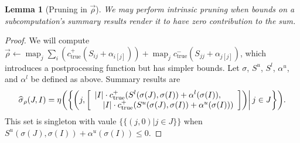 \documentclass{article}
\newtheorem{lemma}{Lemma}
\newcommand{\killspace}{\vspace{-0.08in}}
\newcommand{\sigmahat}{\mathbin{\widehat{\sigma}}}
\DeclareMathOperator*{\map}{map}
\newcommand{\simhrectmin}{S^{l}}
\newcommand{\simhrectmax}{S^{u}}
\newcommand{\true}{\text{true}}
\newcommand{\ocpos}[1]{c^{+}_{#1}}
\newcommand{\ocneg}[1]{c^{-}_{#1}}
\newcommand{\simil}[2]{S_{#1#2}}
\newcommand{\vecrho}{\vec{\rho}}
\newcommand{\falphaj}[2]{\alpha_{#1[#2]}}
\newcommand{\falphamax}{\alpha^{u}}
\newcommand{\falphamin}{\alpha^{l}}
\begin{document}
\begin{lemma}[Pruning in $\vecrho$]
  We may perform intrinsic pruning when bounds on a subcomputation's summary results render it to have zero contribution to the sum.
\end{lemma}
\killspace
\begin{proof}
  We will compute $\vecrho \gets \map_j \sum_i (
  \ocpos{\true}(\simil{i}{j} + \falphaj{i}{j}) ) + \map_j
  \ocneg{\true}(\simil{j}{j} + \falphaj{j}{j})$, which introduces a
  postprocessing function but has simpler bounds.  Let $\sigma$,
  $\simhrectmax$, $\simhrectmin$, $\falphamax$, and $\falphamin$ be
  defined as above.  Summary results are
  \[
  \sigmahat_{\rho}(J,I) = \eta \!\left( \left\{ \left.\! \left( j, \left[ \begin{array}{ll}
    \lefteqn{|I| \cdot \ocpos{\true}(\simhrectmin(\sigma(J),\sigma(I)) + \falphamin(\sigma(I)),} \\
    & |I| \cdot \ocpos{\true}(\simhrectmax(\sigma(J),\sigma(I)) + \falphamax(\sigma(I)))
  \end{array} \right] \right) \right| j \in J \right\} \right)\! .
  \]
  This set is singleton with vaule $\{\{(j,0) | j \in J\}\}$ when
  $\simhrectmax(\sigma(J),\sigma(I)) + \falphamax(\sigma(I)) \leq 0$.
\end{proof}
\end{document}
